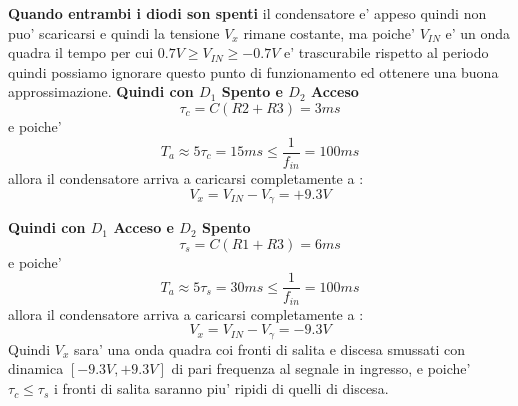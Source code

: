 \documentclass[\main/main.tex]{subfiles}
\begin{document}
\textbf{Quando entrambi i diodi son spenti} il condensatore e' appeso quindi non puo' scaricarsi e quindi la tensione $V_x$ rimane costante, ma poiche' $V_{IN}$ e' un onda quadra il tempo per cui $0.7V \ge V_{IN} \ge -0.7V$ e' trascurabile rispetto al periodo quindi possiamo ignorare questo punto di funzionamento ed ottenere una buona approssimazione.
\taudef
\textbf{Quindi con $D_1$ Spento e $D_2$ Acceso}
\[\tau_c = C (R2 + R3) = 3ms\]
e poiche' 
\[T_a \approx 5 \tau_c = 15ms \le \frac{1}{f_{in}} = 100ms\]
allora il condensatore arriva a caricarsi completamente a :
\[V_x = V_{IN} - V_\gamma = + 9.3V \]

\textbf{Quindi con $D_1$ Acceso e $D_2$ Spento}
\[\tau_s = C (R1 + R3) = 6ms\]
e poiche' 
\[T_a \approx 5 \tau_s = 30ms \le \frac{1}{f_{in}} = 100ms\]
allora il condensatore arriva a caricarsi completamente a :
\[V_x = V_{IN} - V_\gamma = - 9.3V \]
Quindi $V_x$ sara' una onda quadra coi fronti di salita e discesa smussati con dinamica $[-9.3V,+9.3V]$ di pari frequenza al segnale in ingresso, e poiche' $\tau_c \le \tau_s$ i fronti di salita saranno piu' ripidi di quelli di discesa.


\begin{figure}[H]
    \center
\end{figure}
\end{document}
